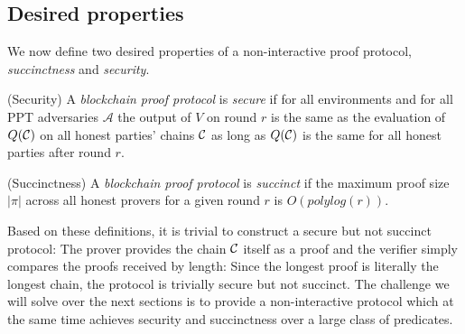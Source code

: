 \subsection{Desired properties}

We now define two desired properties of a non-interactive proof protocol, \textit{succinctness} and \textit{security}.

\begin{definition}{(Security)}
A \textit{blockchain proof protocol} is \textit{secure} if for all environments
and for all PPT adversaries $\mathcal{A}$ the output of $V$ on round $r$ is the
same as the evaluation of $Q(\mathcal{C})$ on all honest parties' chains $\mathcal{C}$ as
long as $Q(\mathcal{C})$ is the same for all honest parties after round $r$.
\end{definition}

\begin{definition}{(Succinctness)}
A \textit{blockchain proof protocol} is \textit{succinct} if the maximum proof
size $|\pi|$ across all honest provers for a given round $r$ is
$O(polylog(r))$.
\end{definition}

Based on these definitions, it is trivial to construct a secure but not succinct
protocol: The prover provides the chain $\mathcal{C}$ itself as a proof and the
verifier simply compares the proofs received by length: Since the longest proof
is literally the longest chain, the protocol is trivially secure but not
succinct. The challenge we will solve over the next sections is to provide a
non-interactive protocol which at the same time achieves security and
succinctness over a large class of predicates.
